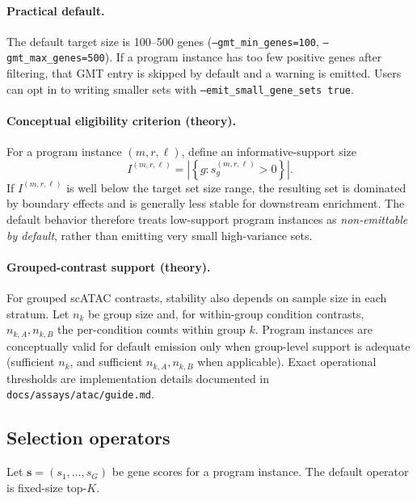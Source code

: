 \documentclass[11pt]{article}
\begin{document}
\paragraph{Practical default.}
The default target size is 100--500 genes (\texttt{--gmt\_min\_genes=100}, \texttt{--gmt\_max\_genes=500}). If a program instance has too few positive genes after filtering, that GMT entry is skipped by default and a warning is emitted. Users can opt in to writing smaller sets with \texttt{--emit\_small\_gene\_sets true}.

\paragraph{Conceptual eligibility criterion (theory).}
For a program instance $(m,r,\ell)$, define an informative-support size
\[
I^{(m,r,\ell)} = \left| \left\{ g : s_g^{(m,r,\ell)} > 0 \right\} \right|.
\]
If $I^{(m,r,\ell)}$ is well below the target set size range, the resulting set is dominated by boundary effects and is generally less stable for downstream enrichment. The default behavior therefore treats low-support program instances as \emph{non-emittable by default}, rather than emitting very small high-variance sets.

\paragraph{Grouped-contrast support (theory).}
For grouped scATAC contrasts, stability also depends on sample size in each stratum. Let $n_k$ be group size and, for within-group condition contrasts, $n_{k,A}, n_{k,B}$ the per-condition counts within group $k$. Program instances are conceptually valid for default emission only when group-level support is adequate (sufficient $n_k$, and sufficient $n_{k,A},n_{k,B}$ when applicable). Exact operational thresholds are implementation details documented in \texttt{docs/assays/atac/guide.md}.

\subsection{Selection operators}
Let $\mathbf{s} = (s_1,\dots,s_G)$ be gene scores for a program instance. The default operator is fixed-size top-$K$.
\end{document}
